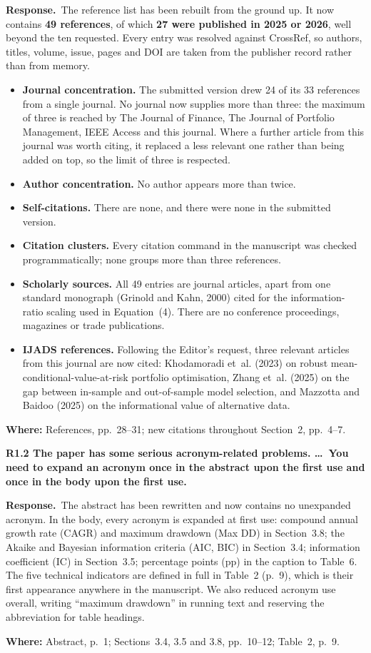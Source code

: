 \documentclass[11pt,a4paper]{article}
\newcommand{\rc}[1]{\par\medskip\noindent\textbf{#1}\par\nopagebreak}
\newcommand{\resp}{\par\noindent\textbf{Response.}\ }
\newcommand{\where}[1]{\par\smallskip\noindent\textcolor{blue!55!black}{\textbf{Where:} #1}\par}
\begin{document}
\resp The reference list has been rebuilt from the ground up. It now contains
\textbf{49 references}, of which \textbf{27 were published in 2025 or 2026}, well beyond
the ten requested. Every entry was resolved against CrossRef, so authors, titles,
volume, issue, pages and DOI are taken from the publisher record rather than from
memory.

\begin{itemize}
\item \textbf{Journal concentration.} The submitted version drew 24 of its 33 references
from a single journal. No journal now supplies more than three: the maximum of three is
reached by The Journal of Finance, The Journal of Portfolio Management, IEEE Access and
this journal. Where a further article from this journal was worth citing, it replaced a
less relevant one rather than being added on top, so the limit of three is respected.
\item \textbf{Author concentration.} No author appears more than twice.
\item \textbf{Self-citations.} There are none, and there were none in the submitted
version.
\item \textbf{Citation clusters.} Every citation command in the manuscript was checked
programmatically; none groups more than three references.
\item \textbf{Scholarly sources.} All 49 entries are journal articles, apart from one
standard monograph (Grinold and Kahn, 2000) cited for the information-ratio scaling used
in Equation~(4). There are no conference proceedings, magazines or trade publications.
\item \textbf{IJADS references.} Following the Editor's request, three relevant articles
from this journal are now cited: Khodamoradi et~al. (2023) on robust
mean-conditional-value-at-risk portfolio optimisation, Zhang et~al. (2025) on the gap
between in-sample and out-of-sample model selection, and Mazzotta and Baidoo (2025) on
the informational value of alternative data.
\end{itemize}
\where{References, pp.~28--31; new citations throughout Section~2, pp.~4--7.}

\rc{R1.2 The paper has some serious acronym-related problems. \dots\ You need to expand
an acronym once in the abstract upon the first use and once in the body upon the first
use.}

\resp The abstract has been rewritten and now contains no unexpanded acronym. In the
body, every acronym is expanded at first use: compound annual growth rate (CAGR) and
maximum drawdown (Max DD) in Section~3.8; the Akaike and Bayesian information criteria
(AIC, BIC) in Section~3.4; information coefficient (IC) in Section~3.5; percentage
points (pp) in the caption to Table~6. The five technical indicators are defined in full
in Table~2 (p.~9), which is their first appearance anywhere in the manuscript. We also
reduced acronym use overall, writing ``maximum drawdown'' in running text and reserving
the abbreviation for table headings.
\where{Abstract, p.~1; Sections~3.4, 3.5 and 3.8, pp.~10--12; Table~2, p.~9.}
\end{document}
